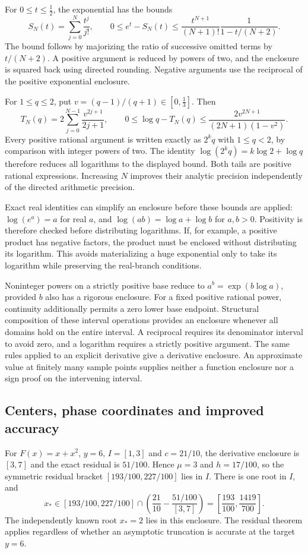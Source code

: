 For $0\le t\le\tfrac12$, the exponential has the bounds
\[
 S_N(t)=\sum_{j=0}^N\frac{t^j}{j!},\qquad
 0\le e^t-S_N(t)\le
 \frac{t^{N+1}}{(N+1)!}\frac1{1-t/(N+2)}.
\]
The bound follows by majorizing the ratio of successive omitted terms by
$t/(N+2)$. A positive argument is reduced by powers of two, and the enclosure
is squared back using directed rounding. Negative arguments use the reciprocal
of the positive exponential enclosure.

For $1\le q\le2$, put $v=(q-1)/(q+1)\in[0,\tfrac13]$. Then
\[
 T_N(q)=2\sum_{j=0}^{N-1}\frac{v^{2j+1}}{2j+1},\qquad
 0\le\log q-T_N(q)\le
 \frac{2v^{2N+1}}{(2N+1)(1-v^2)}.
\]
Every positive rational argument is written exactly as $2^k q$ with
$1\le q<2$, by comparison with integer powers of two. The identity
$\log(2^kq)=k\log2+\log q$ therefore reduces all logarithms to the displayed
bound. Both tails are positive rational expressions. Increasing $N$ improves
their analytic precision independently of the directed arithmetic precision.

Exact real identities can simplify an enclosure before these bounds are applied: $\log(e^a)=a$ for real $a$, and $\log(ab)=\log a+\log b$ for $a,b>0$. Positivity is therefore checked
before distributing logarithms. If, for example, a positive product has
negative factors, the product must be enclosed without distributing its logarithm. This avoids
materializing a huge exponential only to take its logarithm while preserving
the real-branch conditions.

Noninteger powers on a strictly positive base reduce to
$a^b=\exp(b\log a)$, provided $b$ also has a rigorous enclosure.
For a fixed positive rational power, continuity additionally permits a zero
lower base endpoint. Structural composition of these interval operations
provides an enclosure whenever all domains hold on the entire interval.
A reciprocal requires its denominator interval to avoid zero, and a
logarithm requires a strictly positive argument. The same rules applied to
an explicit derivative give a derivative enclosure. An approximate value
at finitely many sample points supplies neither a function enclosure nor
a sign proof on the intervening interval.

\subsection{Centers, phase coordinates and improved accuracy}

\begin{example}
For $F(x)=x+x^2$, $y=6$, $I=[1,3]$ and $c=21/10$, the derivative enclosure
is $[3,7]$ and the exact residual is $51/100$. Hence $\mu=3$ and
$h=17/100$, so the symmetric residual bracket
$[193/100,227/100]$ lies in $I$. There is one root in $I$, and
\[
 x_*\in[193/100,227/100]\cap
 \left(\frac{21}{10}-\frac{51/100}{[3,7]}\right)
 =\left[\frac{193}{100},\frac{1419}{700}\right].
\]
The independently known root $x_*=2$ lies in this enclosure. The residual
theorem applies regardless of whether an asymptotic truncation is accurate
at the target $y=6$.
\end{example}

